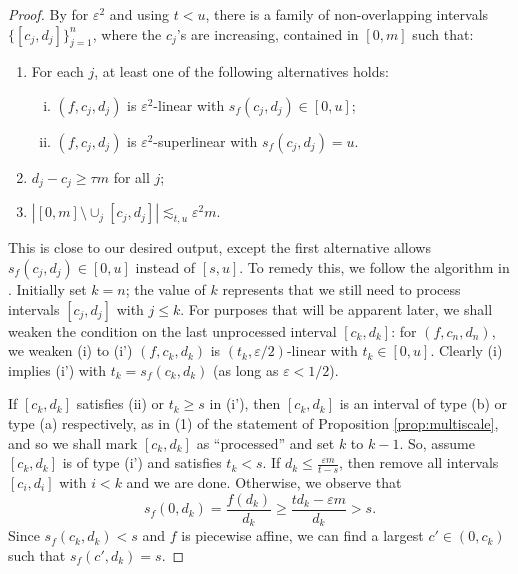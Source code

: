 \documentclass{amsart}
\newcommand{\eps}{\varepsilon}
\newcommand{\lesim}{\lesssim}
\begin{document}
\begin{proof}
    By \cite[Lemma 2.7]{orponen2023projections} for $\eps^2$ and using $t < u$, there is a family of non-overlapping intervals $\{ [c_j, d_j] \}_{j=1}^n$, where the $c_j$'s are increasing,  contained in $[0, m]$ such that:

    \begin{enumerate}
        \item For each $j$, at least one of the following alternatives holds: 
        \begin{enumerate}[(i)]
            \item $(f, c_j, d_j)$ is $\eps^2$-linear with $s_f (c_j, d_j) \in [0, u]$;

            \item $(f, c_j, d_j)$ is $\eps^2$-superlinear with $s_f (c_j, d_j) = u$.
        \end{enumerate}

        \item $d_j - c_j \ge \tau m$ for all $j$;

        \item $|[0, m] \setminus \cup_j [c_j, d_j]| \lesim_{t,u} \eps^2 m$.
    \end{enumerate}
    This is close to our desired output, except the first alternative allows $s_f (c_j, d_j) \in [0, u]$ instead of $[s, u]$. To remedy this, we follow the algorithm in \cite[Lemma 8.5]{orponen2021hausdorff}. Initially set $k = n$; the value of $k$ represents that we still need to process intervals $[c_j, d_j]$ with $j \le k$. For purposes that will be apparent later, we shall weaken the condition on the last unprocessed interval $[c_k, d_k]$: for $(f, c_n, d_n)$, we weaken (i) to (i') $(f, c_k, d_k)$ is $(t_k, \eps/2)$-linear with $t_k \in [0, u]$. Clearly (i) implies (i') with $t_k = s_f (c_k, d_k)$ (as long as $\eps < 1/2$).

    If $[c_k, d_k]$ satisfies (ii) or $t_k \ge s$ in (i'), then $[c_k, d_k]$ is an interval of type (b) or type (a) respectively, as in (1) of the statement of Proposition \ref{prop:multiscale}, and so we shall mark $[c_k, d_k]$ as ``processed'' and set $k$ to $k-1$. So, assume $[c_k, d_k]$ is of type (i') and satisfies $t_k < s$. If $d_k \le \frac{\eps m}{t-s}$, then remove all intervals $[c_i, d_i]$ with $i < k$ and we are done. Otherwise, we observe that
    \begin{equation*}
        s_f (0, d_k) = \frac{f(d_k)}{d_k} \ge \frac{td_k - \eps m}{d_k} > s.
    \end{equation*}
    Since $s_f (c_k, d_k) < s$ and $f$ is piecewise affine, we can find a largest $c' \in (0, c_k)$ such that $s_f (c', d_k) = s$.


\end{proof}
\end{document}
